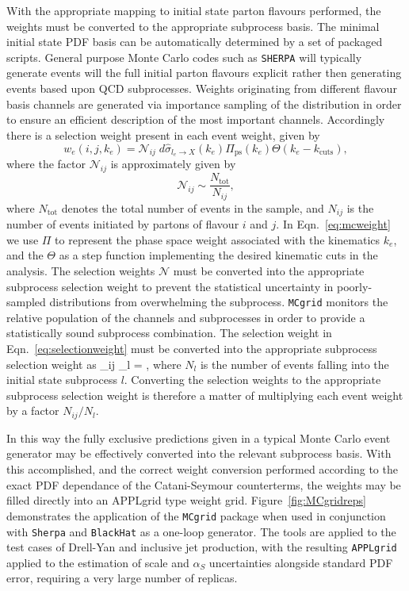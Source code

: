 With the appropriate mapping to initial state parton flavours performed, the weights must be converted to the appropriate subprocess basis. The minimal initial state PDF basis can be automatically determined by a set of packaged scripts.
General purpose Monte Carlo codes such as {\tt SHERPA} will typically generate events will the full initial parton flavours explicit rather then generating events based upon QCD subprocesses. Weights originating from different flavour basis channels are generated via importance sampling of the distribution in order to ensure an efficient description of the most important channels.  Accordingly there is a selection weight present in each event weight, given by 
\begin{equation}  
w_e(i,j,k_e) =\mathcal{N}_{ij}\;d \hat{\sigma}_{l_e \to X}(k_e) \Pi_{\text{ps}}(k_e) \Theta (k_e-k_{\text{cuts}}), \label{eq:mcweight}
\end{equation}
where the factor $\mathcal{N}_{ij}$ is approximately given by
\begin{equation}
\mathcal{N}_{ij} \sim \frac{N_{\text{tot}}}{N_{ij}}, \label{eq:selectionweight}
\end{equation}
where $N_{\text{tot}}$ denotes the total number of events in the sample, and $N_{ij}$ is the number of events initiated by partons of flavour $i$ and $j$. In Eqn.~\ref{eq:mcweight} we use $\Pi$ to represent the phase space weight associated with the kinematics $k_e$, and the $\Theta$ as a step function implementing the desired kinematic cuts in the analysis. 
The selection weights $\mathcal{N}$ must be converted into the appropriate subprocess selection weight to prevent the statistical uncertainty in poorly-sampled distributions from overwhelming the subprocess. {\tt MCgrid} monitors the relative population of the channels and subprocesses in order to provide a statistically sound subprocess combination. The selection weight in Eqn.~\ref{eq:selectionweight} must be converted into the appropriate subprocess selection weight as
\be {}_{ij} \to {}_{l} = , \ee
where $N_{l}$ is the number of events falling into the initial state subprocess $l$. Converting the selection weights to the appropriate subprocess selection weight is therefore a matter of multiplying each event weight by a factor $N_{ij}/N_{l}$.


In this way the fully exclusive predictions given in a typical Monte Carlo event generator may be effectively converted into the relevant subprocess basis. With this accomplished, and the correct weight conversion performed according to the exact PDF dependance of the Catani-Seymour counterterms, the weights may be filled directly into an APPLgrid type weight grid. Figure~\ref{fig:MCgridreps} demonstrates the application of the {\tt MCgrid} package when used in conjunction with {\tt Sherpa} and {\tt BlackHat} as a one-loop generator. The tools are applied to the test cases of Drell-Yan and inclusive jet production, with the resulting { \tt APPLgrid} applied to the estimation of scale and $\alpha_S$ uncertainties alongside standard PDF error, requiring a very large number of replicas.

